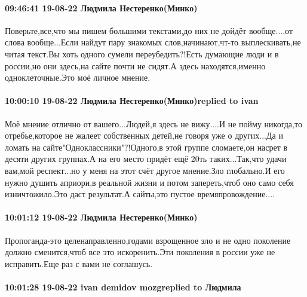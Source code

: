

\paragraph{09:46:41 19-08-22 Людмила Нестеренко(Минко)}

Поверьте,все,что мы пишем большими текстами,до них не дойдёт вообще....от слова
вообще...Если найдут пару знакомых слов,начинают,чт-то выплескивать,не читая
текст.Вы хоть одного сумели переубедить?!Есть думающие люди и в россии,но они
здесь,на сайте почти не сидят.А здесь находятся,именно одноклеточные.Это моё
личное мнение.

\paragraph{10:00:10 19-08-22 Людмила Нестеренко(Минко)replied to ivan}

Моё мнение отлично от вашего...Людей,я здесь не вижу....И не пойму никогда,то
отребье,которое не жалеет собственных детей,не говоря уже о других...Да и
ломать на сайте"Одноклассники"?!Одного,в этой группе сломаете,он насрет в
десяти других группах.А на его место придёт ещё 20ть таких...Так,что удачи
вам,мой респект...но у меня на этот счёт другое мнение.Зло глобально.И его
нужно душить априори,в реальной жизни и потом запереть,чтоб оно само себя
изничтожило.Это даст результат.А сайты,это пустое времяпровождение....

\paragraph{10:01:12 19-08-22 Людмила Нестеренко(Минко)}

Пропоганда-это целенаправленно,годами взрощенное зло и не одно поколение должно
сменится,чтоб все это искоренить.Эти поколения в россии уже не исправить.Еще
раз с вами не соглашусь.

\paragraph{10:01:28 19-08-22 ivan demidov mozgreplied to Людмила}

